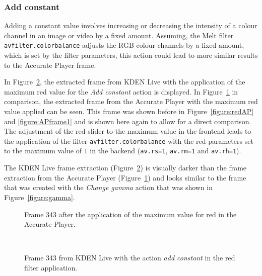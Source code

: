 \documentclass[../MasterThesis.tex]{subfiles}
\begin{document}
\subsubsection*{Add constant}

Adding a constant value involves increasing or decreasing the intensity of a colour channel in an image or video by a fixed amount. Assuming, the Melt filter \texttt{avfilter.colorbalance} adjusts the RGB colour channels by a fixed amount, which is set by the filter parameters, this action could lead to more similar results to the Accurate Player frame.

In Figure~\ref{figure:addconstant}, the extracted frame from KDEN Live with the application of the maximum red value for the \textit{Add constant} action is displayed. 
In Figure~\ref{figure:APframe2} in comparison, the extracted frame from the Accurate Player with the maximum red value applied can be seen. This frame was shown before in Figure~\ref{figure:redAP} and \ref{figure:APframe1} and is shown here again to allow for a direct comparison. The adjustment of the red slider to the maximum value in the frontend leads to the application of the filter \texttt{avfilter.colorbalance} with the red parameters set to the maximum value of $1$ in the backend (\texttt{av.rs=1}, \texttt{av.rm=1} and \texttt{av.rh=1}).

The KDEN Live frame extraction (Figure~\ref{figure:addconstant}) is visually darker than the frame extraction from the Accurate Player (Figure~\ref{figure:APframe2}) and looks similar to the frame that was created with the \textit{Change gamma} action that was shown in Figure~\ref{figure:gamma}.

\begin{minipage}{0.48\textwidth}
	\begin{figure}[H]
		\begin{center}
			\caption[Frame 343 after the application of the red filter in the Accurate Player.]{Frame 343 after the application of the maximum value for red in the Accurate Player.}
			\label{figure:APframe2}
		\end{center}
	\end{figure}
\end{minipage}\begin{minipage}{0.04\textwidth}
	\ 
\end{minipage}\begin{minipage}{0.48\textwidth}
	\begin{figure}[H]
		\begin{center}
			\caption[Frame 343 from KDEN Live with the action \textit{add constant}.]{Frame 343 from KDEN Live with the action \textit{add constant} in the red filter application.}
			\label{figure:addconstant}
		\end{center}
	\end{figure}
\end{minipage}
\vspace*{1em}
\end{document}
